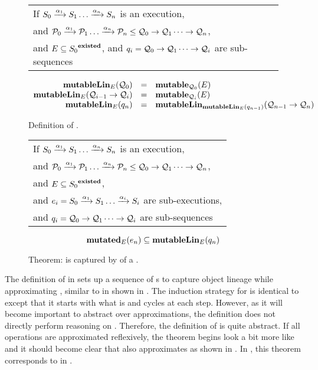 \begin{figure}
  \begin{tabular}{l}
    If \(S_0 \xrightarrow {\alpha_1} S_1 \dots \xrightarrow {\alpha_{n}} S_{n}\) is an execution, \\
    and \(\mathcal{P}_0 \xrightarrow {\alpha_1} \mathcal{P}_1 \dots \xrightarrow {\alpha_{n}} \mathcal{P}_{n} \leq \mathcal{Q}_0 \rightarrow \mathcal{Q}_1 \dots \rightarrow \mathcal{Q}_{n}\), \\
    and \(E \subseteq {S_0}^{\mathbf{existed}}\), and \( q_i = \mathcal{Q}_0 \rightarrow \mathcal{Q}_1 \dots \rightarrow \mathcal{Q}_{i}\) are sub-sequences
  \end{tabular}
  \[
  \begin{array}{rcl}
    \mathbf{mutableLin}_{E}(\mathcal{Q}_{0}) & = & \mathbf{mutable}_{\mathcal{Q}_{0}}(E) \\
    \mathbf{mutableLin}_{E}(\mathcal{Q}_{i-1} \rightarrow \mathcal{Q}_{i}) & = & \mathbf{mutable}_{\mathcal{Q}_{i}}(E) \\
    \mathbf{mutableLin}_{E}(q_n) & = & \mathbf{mutableLin}_{\mathbf{mutableLin}_{E}(q_{n-1})}(\mathcal{Q}_{n-1} \rightarrow \mathcal{Q}_{n})
  \end{array}
  \]
  \caption{Definition of \mutableLineage{}.\label{def:SW:mutableLineage}}
\end{figure}

\begin{figure}
  \begin{tabular}{l}
    If \(S_0 \xrightarrow {\alpha_1} S_1 \dots \xrightarrow {\alpha_{n}} S_{n}\) is an execution, \\
    and \(\mathcal{P}_0 \xrightarrow {\alpha_1} \mathcal{P}_1 \dots \xrightarrow {\alpha_{n}} \mathcal{P}_{n} \leq \mathcal{Q}_0 \rightarrow \mathcal{Q}_1 \dots \rightarrow \mathcal{Q}_{n}\), \\
    and \(E \subseteq {S_0}^{\mathbf{existed}}\), \\
    and \( e_i = S_0 \xrightarrow {\alpha_1} S_1 \dots \xrightarrow {\alpha_{i}} S_{i}\) are sub-executions, \\
    and \( q_i = \mathcal{Q}_0 \rightarrow \mathcal{Q}_1 \dots \rightarrow \mathcal{Q}_{i}\) are sub-sequences
  \end{tabular}
  \[
  \mathbf{mutated}_{E}(e_n) \subseteq \mathbf{mutableLin}_{E}(q_n)
  \]
  \caption{Theorem: \mutated{} is captured by of a \mutableLineage{}.\label{thm:SW:mutatedmutableLinage}}
\end{figure}

The definition of \mutableLineage{} in  sets up a sequence of \mutable{}s to capture object lineage while approximating \mutated{}, similar to \COQmutableExecute{} in \TMmodelName{} shown in .
The induction strategy for \mutableLineage{} is identical to \mutated{} except that it starts with what is \mutable{} and cycles \mutable{} at each step.
However, as it will become important to abstract over approximations, the definition does not directly perform reasoning on .
Therefore, the definition of \mutableLineage{} is quite abstract.
If all \potacc{} operations are approximated reflexively, the theorem begins look a bit more like \mutable{} and it should become clear that \mutableLineage{} also approximates \mutated{} as shown in .
In \TMmodelName{}, this theorem corresponds to \COQmutableDirAccExecuteApproxMutated{} in .

